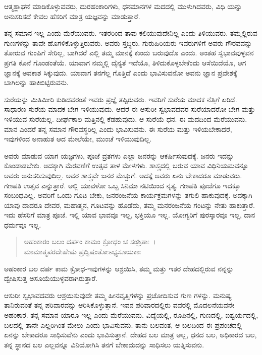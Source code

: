 {\small ಆತ್ಮಶ್ಲಾಘನೆ ಮಾಡಿಕೊಳ್ಳುವವರು, ದುರಹಂಕಾರಿಗಳು, ಧನಮಾನಗಳ ಮದದಲ್ಲಿ ಮುಳುಗಿದವರು, ವಿಧಿ ಯನ್ನು ಅನುಸರಿಸದೆ ಕೇವಲ ಹೆಸರಿಗೆ ಮಾತ್ರ ಯಜ್ಞವನ್ನು ಮಾಡುತ್ತಾರೆ.}

ತನ್ನ ಸಮಾನ ಇಲ್ಲ ಎಂದು ಮೆರೆಯುವರು. ಇತರರಿಂದ ತಾವು ಕಲಿಯುವುದೇನಿಲ್ಲ ಎಂದು ತಿಳಿಯುವರು. ತಮ್ಮಲ್ಲಿರುವ ಗುಣಗಳನ್ನು ತಾವೇ ಹೊಗಳಿಕೊಳ್ಳುತ್ತಿರುವರು. ಅವರು ಸ್ತಬ್ಧರು. ಗುರುಹಿರಿಯರು ಇವರುಗಳಿಗೆ ಅವರು ಗೌರವವನ್ನು ತೋರುವ ಗುಂಪಿಗೆ ಸೇರಿಲ್ಲ, ಬಾಗಿದರೆ ಎಲ್ಲಿ ತಮ್ಮ ಮಾನಕ್ಕೆ ಕುಂದು ಬರುವುದೊ ಎಂದು. ಅಂತಹ ಸ್ವಭಾವವುಳ್ಳವನ ಪ್ರಗತಿ ಕೊನೆ ಗೊಂಡಂತೆಯೆ. ಯಾವಾಗ ನಮ್ಮಲ್ಲಿ ದೈನ್ಯತೆ ಇದೆಯೊ, ತಿಳಿದುಕೊಳ್ಳಬೇಕೆಂದು ಆಸೆಯಿದೆಯೊ, ಆಗ ಜ್ಞಾನಕ್ಕೆ ಅವಕಾಶ ಸಿಕ್ಕುವುದು. ಯಾವಾಗ ತನಗೆಲ್ಲ ಗೊತ್ತಿದೆ ಎಂದು ಭಾವಿಸುವನೋ ಅವನು ಜ್ಞಾನ ಪ್ರವೇಶಕ್ಕೆ ಬಾಗಿಲನ್ನು ಹಾಕಿಬಿಟ್ಟಿರುವನು.

ಸುರೆಯನ್ನು ಮಿತಿಮೀರಿ ಕುಡಿದವರಂತೆ ಇವರು ಪ್ರಜ್ಞೆ ತಪ್ಪಿರುವರು. ಇವರಿಗೆ ಸುರೆಯ ಮಾದಕ ನೆತ್ತಿಗೆ ಏರಿದೆ. ಸಾಧಾರಣ ಸುರೆಯ ಮಾದಕ ಬೇಗ ಇಳಿಯುವುದು. ಆದರೆ ಈ ಆಸುರೀ ಸ್ವಭಾವದವರ ಸುರೆಯಾದರೋ ಬೇಗ ಮತ್ತು ಇಳಿಯುವ ಸುರೆಯಲ್ಲ. ದೀರ್ಘಕಾಲ ಮತ್ತಿನಲ್ಲಿ ಕೆಡಹುವುದು. ಆ ಸುರೆಯೆ ಧನ. ಈ ಮದದಿಂದ ಮೆರೆಯುವನು. ಮಾನ ಎಂದರೆ ತನ್ನ ಸಮಾನ ಗೌರವಸ್ಥರಿಲ್ಲ ಎಂದು ಭಾವಿಸುವನು. ಈ ಸುರೆಯ ಮತ್ತು ಇಳಿಯಬೇಕಾದರೆ, ಇವುಗಳಿಂದ ಅನಾಹುತ ಆದ ಮೇಲೆಯೇ, ಮುಂಚೆ ಇಳಿಯುವುದಿಲ್ಲ.

ಅವರು ಮಾಡುವ ಯಾಗ ಯಜ್ಞಗಳು, ಪೂಜೆ ವ್ರತಗಳು ಎಲ್ಲಾ ಜನರನ್ನು ಆಕರ್ಷಿಸುವುದಕ್ಕೆ. ಜನರು ಇದನ್ನು ಕೊಂಡಾಡಬೇಕು. ಅದಕ್ಕಾಗಿ ಮೆರವಣಿಗೆ ಉತ್ಸವ ತಾಳ ಮೇಳಗಳು. ಶಾಸ್ತ್ರದಲ್ಲಿ ಬರುವ ಯಾವ ವಿಧಿನಿಯಮವನ್ನೂ ಅವರು ಅನುಸರಿಸುವುದಿಲ್ಲ. ಅವರ ಶಾಸ್ತ್ರವೇ ಜನರ ಮೆಚ್ಚುಗೆ. ಅದಕ್ಕೆ ಅವರು ಏನು ಬೇಕಾದರೂ ಮಾಡುವರು. ಗಣಪತಿ ಉತ್ಸವ ಎನ್ನುತ್ತಾರೆ. ಅಲ್ಲಿ ಯಾವಳೋ ಒಬ್ಬ ಸಿನಿಮಾ ನಟಿಯಿಂದ ನೃತ್ಯ. ಗಣಪತಿ ಪೂಜೆಗೂ ಇದಕ್ಕೂ ಸಂಬಂಧವಿಲ್ಲ. ಅವರಿಗೆ ಒಂದು ಗೂಟ ಬೇಕು, ಜನರಂಜನೆಯ ಕಾರ್ಯಕ್ರಮಗಳನ್ನು ತಗುಲಿ ಹಾಕುವುದಕ್ಕೆ. ಅದಕ್ಕಾಗಿ ಯಾವು ದಾದರೂ ದೇವರ, ಮಹಾತ್ಮನ, ಗೂಟವನ್ನು ಹೊಡೆದು, ತಮ್ಮ ಮನರಂಜನೆಯ ಗಂಟನ್ನು ನೇತು ಹಾಕುತ್ತಾರೆ. ಇದು ಹೆಸರಿಗೆ ಮಾತ್ರ ಪೂಜೆ. ಇಲ್ಲಿ ಯಾವ ಭಾವವೂ ಇಲ್ಲ, ಭಕ್ತಿಯೂ ಇಲ್ಲ. ಯೋಗ್ಯರಿಗೆ ಪುರಸ್ಕಾರವೂ ಇಲ್ಲ, ದಾನ ಧರ್ಮವೂ ಇಲ್ಲ.

\begin{verse}
ಅಹಂಕಾರಂ ಬಲಂ ದರ್ಪಂ ಕಾಮಂ ಕ್ರೋಧಂ ಚ ಸಂಶ್ರಿತಾಃ~।\\ಮಾಮಾತ್ಮಪರದೇಹೇಷು ಪ್ರದ್ವಿಷಂತೋಽಭ್ಯಸೂಯಕಾಃ 
\end{verse}

{\small ಅಹಂಕಾರ ಬಲ ದರ್ಪ ಕಾಮ ಕ್ರೋಧ-ಇವುಗಳನ್ನು ಆಶ್ರಯಿಸಿ, ತಮ್ಮ ಮತ್ತು ಇತರ ದೇಹದಲ್ಲಿರುವ ನನ್ನನ್ನು ದ್ವೇಷಿಸುತ್ತ ಅಸೂಯೆಯುಳ್ಳವರಾಗಿರುತ್ತಾರೆ.}

ಆಸುರೀ ಸ್ವಭಾವದವರು ಆಶ್ರಯಿಸುವುದೇ ತಮ್ಮ ಹೀನವೃತ್ತಿಗಳನ್ನು ಪ್ರಚೋದಿಸುವ ಗುಣ ಗಳನ್ನು. ಮನುಷ್ಯ ತಾನಿರುವಂತೆ ತನ್ನ ಪರಿವಾರವನ್ನು ಆರಿಸಿಕೊಳ್ಳುತ್ತಾನೆ. ಇವನ ಪರಿವಾರದಲ್ಲಿರು ವವರಲ್ಲಿ ಮೊದಲನೆಯವನೇ ಅಹಂಕಾರ. ತನ್ನ ಸಮಾನ ಯಾರೂ ಇಲ್ಲ ಎಂದು ಮೆರೆಯುವನು. ವಿದ್ಯೆಯಲ್ಲಿ, ರೂಪಿನಲ್ಲಿ, ಗುಣದಲ್ಲಿ, ಐಶ್ವರ್ಯದಲ್ಲಿ, ಬಲದಲ್ಲಿ ತಾನೇ ಎಲ್ಲರಿಗಿಂತ ಮೇಲು ಎಂದು ಭಾವಿಸುವನು. ತಾನು ಬಲವಂತ, ಆ ಬಲದಿಂದ ಈ ಪ್ರಪಂಚದಲ್ಲಿ ಏನನ್ನು ಬೇಕಾದರೂ ಸಾಧಿಸುವೆನು ಎಂದು ಭಾವಿಸುತ್ತಾನೆ. ದೇಹದ ಬಲ ಮಾತ್ರ ಅಲ್ಲ, ಧನದ ಬಲ, ಅಧಿಕಾರದ ಬಲ, ತನ್ನ ಸ್ಥಾನದ ಬಲ ಎಲ್ಲವನ್ನೂ ವಿನಿಯೋಗಿಸಿ ತನಗೆ ಬೇಕಾದುದನ್ನು ಸಾಧಿಸಲು ಯತ್ನಿಸುವನು.

